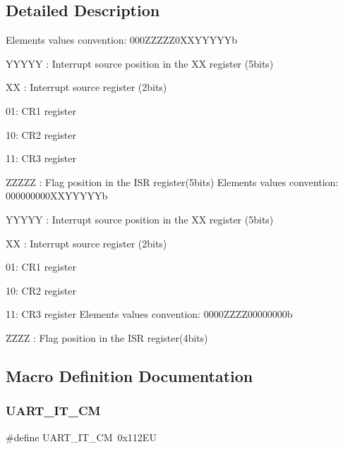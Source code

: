 \subsection{Detailed Description}
Elements values convention\+: 000Z\+Z\+Z\+Z\+Z0\+X\+X\+Y\+Y\+Y\+Y\+Yb
\begin{DoxyItemize}
\item Y\+Y\+Y\+YY \+: Interrupt source position in the XX register (5bits)
\item XX \+: Interrupt source register (2bits)
\begin{DoxyItemize}
\item 01\+: C\+R1 register
\item 10\+: C\+R2 register
\item 11\+: C\+R3 register
\end{DoxyItemize}
\item Z\+Z\+Z\+ZZ \+: Flag position in the I\+SR register(5bits) Elements values convention\+: 000000000X\+X\+Y\+Y\+Y\+Y\+Yb
\item Y\+Y\+Y\+YY \+: Interrupt source position in the XX register (5bits)
\item XX \+: Interrupt source register (2bits)
\begin{DoxyItemize}
\item 01\+: C\+R1 register
\item 10\+: C\+R2 register
\item 11\+: C\+R3 register Elements values convention\+: 0000Z\+Z\+Z\+Z00000000b
\end{DoxyItemize}
\item Z\+Z\+ZZ \+: Flag position in the I\+SR register(4bits) 
\end{DoxyItemize}

\subsection{Macro Definition Documentation}
\mbox{\label{group___u_a_r_t___interrupt__definition_ga4c22e866bce68975a180828012489106}} 
\subsubsection{\texorpdfstring{UART\_IT\_CM}{UART\_IT\_CM}}
{\footnotesize\ttfamily \#define U\+A\+R\+T\+\_\+\+I\+T\+\_\+\+CM~0x112\+EU}

